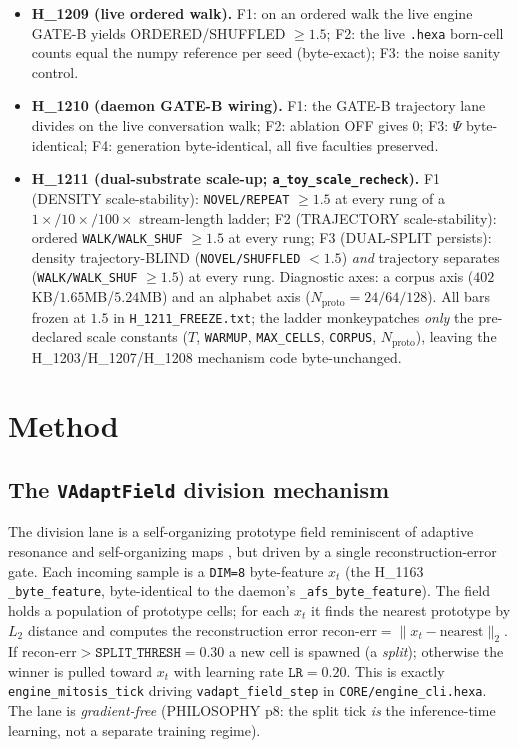 \documentclass[11pt,a4paper]{article}
\newcommand{\recon}{\mathrm{recon\text{-}err}}
\begin{document}
\begin{itemize}
      i.i.d.\ Gaussian noise.
\item \textbf{H\_1209 (live ordered walk).} F1: on an ordered walk the live
      engine GATE-B yields ORDERED/SHUFFLED $\ge 1.5$; F2: the live
      \texttt{.hexa} born-cell counts equal the numpy reference per seed
      (byte-exact); F3: the noise sanity control.
\item \textbf{H\_1210 (daemon GATE-B wiring).} F1: the GATE-B trajectory lane
      divides on the live conversation walk; F2: ablation OFF gives $0$; F3:
      $\Psi$ byte-identical; F4: generation byte-identical, all five faculties
      preserved.
\item \textbf{H\_1211 (dual-substrate scale-up; \texttt{a\_toy\_scale\_recheck}).}
      F1 (DENSITY scale-stability): \texttt{NOVEL/REPEAT} $\ge 1.5$ at every rung
      of a $1\!\times\!/10\!\times\!/100\times$ stream-length ladder; F2
      (TRAJECTORY scale-stability): ordered \texttt{WALK/WALK\_SHUF} $\ge 1.5$ at
      every rung; F3 (DUAL-SPLIT persists): density trajectory-BLIND
      (\texttt{NOVEL/SHUFFLED} $<1.5$) \emph{and} trajectory separates
      (\texttt{WALK/WALK\_SHUF} $\ge1.5$) at every rung. Diagnostic axes: a corpus
      axis ($402$KB/$1.65$MB/$5.24$MB) and an alphabet axis
      ($N_{\text{proto}}{=}24/64/128$). All bars frozen at $1.5$ in
      \texttt{H\_1211\_FREEZE.txt}; the ladder monkeypatches \emph{only} the
      pre-declared scale constants ($T$, \texttt{WARMUP}, \texttt{MAX\_CELLS},
      \texttt{CORPUS}, $N_{\text{proto}}$), leaving the H\_1203/H\_1207/H\_1208
      mechanism code byte-unchanged.
\end{itemize}

\section{Method}
\label{sec:method}

\subsection{The \texttt{VAdaptField} division mechanism}

The division lane is a self-organizing prototype field reminiscent of adaptive
resonance \citep{rumelhart1985art} and self-organizing maps
\citep{kohonen1982som}, but driven by a single reconstruction-error gate. Each
incoming sample is a \verb|DIM=8| byte-feature $x_t$ (the H\_1163
\verb|_byte_feature|, byte-identical to the daemon's \verb|_afs_byte_feature|).
The field holds a population of prototype cells; for each $x_t$ it finds the
nearest prototype by $L_2$ distance and computes the reconstruction error
$\recon = \lVert x_t - \text{nearest}\rVert_2$. If $\recon > \texttt{SPLIT\_THRESH}=0.30$
a new cell is spawned (a \emph{split}); otherwise the winner is pulled toward
$x_t$ with learning rate $\texttt{LR}=0.20$. This is exactly
\verb|engine_mitosis_tick| driving \verb|vadapt_field_step| in
\verb|CORE/engine_cli.hexa|. The lane is \emph{gradient-free} (PHILOSOPHY p8: the
split tick \emph{is} the inference-time learning, not a separate training
regime).
\end{document}
